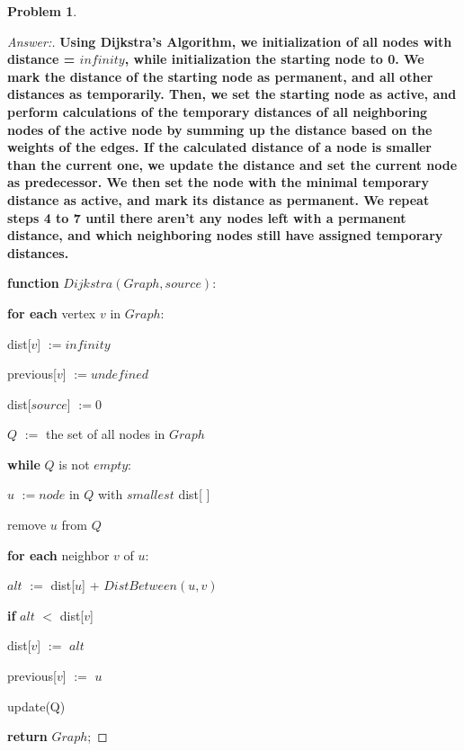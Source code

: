 \documentclass[11pt]{article}
\theoremstyle{definition}
\theoremstyle{definition}
\newtheorem{required}{Problem}
\theoremstyle{definition}
\begin{document}
\begin{required}
\begin{enumerate}[label=(\alph*)]
\begin{proof}[Answer:]
\textbf{Using Dijkstra's Algorithm, we initialization of all nodes with distance = $infinity$, while initialization the starting node to 0. We mark the distance of the starting node as permanent, and all other distances as temporarily. Then, we set the starting node as active, and perform calculations of the temporary distances of all neighboring nodes of the active node by summing up the distance based on the weights of the edges.
If the calculated distance of a node is smaller than the current one, we update the distance and set the current node as predecessor. We then set the node with the minimal temporary distance as active, and mark its distance as permanent.
We repeat steps 4 to 7 until there aren't any nodes left with a permanent distance, and which neighboring nodes still have assigned temporary distances.}

\item \textbf{function} $Dijkstra(Graph, source):$ \
\item	\hspace*{10mm} \textbf{for each} vertex $v$ in $Graph$: \
\item	\hspace*{20mm} dist[$v$] $:= infinity$ \
\item	\hspace*{20mm} previous[$v$] $:= undefined$ \
\item	\hspace*{10mm} dist[$source$] $:= 0$ \
\item	\hspace*{10mm} $Q$ $:=$ the set of all nodes in $Graph$ \
\item	\hspace*{10mm} \textbf{while} $Q$ is not $empty$:
\item	\hspace*{20mm} $u$ $:= node$ in $Q$ with $smallest$ dist[ ] \
\item	\hspace*{20mm} remove $u$ from $Q$ \
\item	\hspace*{20mm} \textbf{for each} neighbor $v$ of $u$: \
\item	\hspace*{30mm} $alt$ $:=$ dist[$u$] + $DistBetween(u, v)$ \
\item	\hspace*{30mm} \textbf{if} $alt$ $<$ dist[$v$] \
\item	\hspace*{40mm} dist[$v$] $:=$ $alt$ \
\item	\hspace*{40mm} previous[$v$] $:=$ $u$
\item	\hspace*{40mm} update(Q) \
\item \hspace*{10mm} \textbf{return} $Graph$;
\end{proof}




\end{enumerate}
\end{required}
\end{document}
